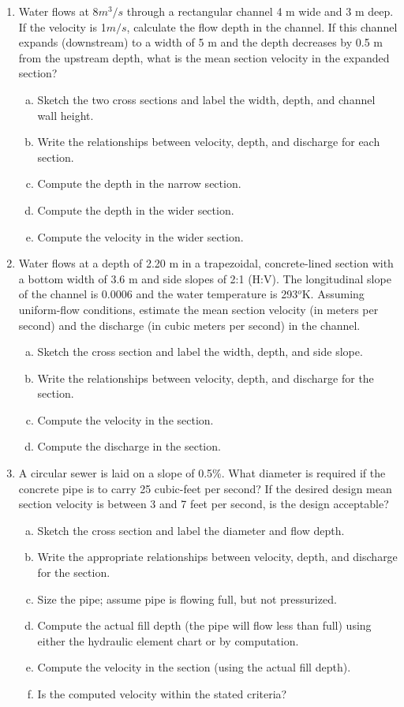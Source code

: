\documentclass[12pt]{article}
\begin{document}
\begin{enumerate}

\item Water flows at 8$m^3/s$ through a rectangular channel 4 m wide and 3 m deep.  If the velocity is 1$m/s$, calculate the flow depth in the channel.  If this channel expands (downstream) to a width of 5 m and the depth decreases by 0.5 m from the upstream depth, what is the mean section velocity in the expanded section?
\begin{enumerate}[a)]
\item Sketch the two cross sections and label the width, depth, and channel wall height.
\item Write the relationships between velocity, depth, and discharge for each section.
\item Compute the depth in the narrow section.
\item Compute the depth in the wider section.
\item Compute the velocity in the wider section.
\end{enumerate}
\item Water flows at a depth of 2.20 m in a trapezoidal, concrete-lined section with a bottom width of 3.6 m and side slopes of 2:1 (H:V).  The longitudinal slope of the channel is 0.0006 and the water temperature is 293$^o$K. Assuming uniform-flow conditions, estimate the mean section velocity (in meters per second) and the discharge (in cubic meters per second)  in the channel. 
\begin{enumerate}[a)]
\item Sketch the cross section and label the width, depth, and side slope.
\item Write the relationships between velocity, depth, and discharge for the section.
\item Compute the velocity in the section.
\item Compute the discharge in the section.
\end{enumerate}
\clearpage
\item A circular sewer is laid on a slope of 0.5\%.  What diameter is required if the concrete pipe is to carry 25 cubic-feet per second?   If the desired design mean section velocity is between 3 and 7 feet per second, is the design acceptable?
\begin{enumerate}[a)]
\item Sketch the cross section and label the diameter and flow depth.
\item Write the appropriate relationships between velocity, depth, and discharge for the section.
\item Size the pipe; assume pipe is flowing full, but not pressurized.
\item Compute the actual fill depth (the pipe will flow less than full) using either the hydraulic element chart or by computation.
\item Compute the velocity in the section (using the actual fill depth).
\item Is the computed velocity within the stated criteria?
\end{enumerate}


\end{enumerate}
\end{document}
